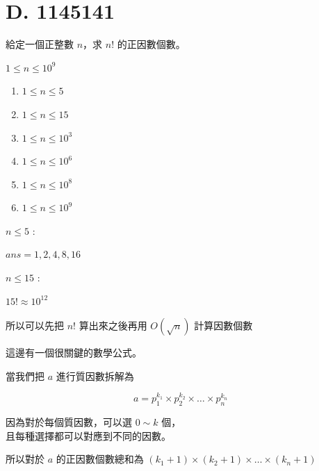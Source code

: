 \section{D. 1145141}

\begin{frame}{}
    給定一個正整數 $n$，求 $n!$ 的正因數個數。

    $1 \le n \le 10^9$
\end{frame}

\begin{frame}{}
    \begin{enumerate}
        \item{$1 \le n \le 5$}
        \item{$1 \le n \le 15$}
        \item{$1 \le n \le 10^3$}
        \item{$1 \le n \le 10^6$}
        \item{$1 \le n \le 10^8$}
        \item{$1 \le n \le 10^9$}
    \end{enumerate}
\end{frame}

\begin{frame}{}
    $n \le 5$ :

    $ans = {1, 2, 4, 8, 16}$
    \pause

    $n \le 15$ :

    $15! \approx 10^{12}$

    所以可以先把 $n!$ 算出來之後再用 $O(\sqrt{n})$ 計算因數個數
\end{frame}

\begin{frame}{}
    這邊有一個很關鍵的數學公式。

    \begin{corollary}
    當我們把 $a$ 進行質因數拆解為

    $$
    a = p_1^{k_1} \times p_2^{k_2} \times \ldots \times p_n^{k_n}
    $$

    因為對於每個質因數，可以選 $0 \sim k$ 個，\\且每種選擇都可以對應到不同的因數。

    所以對於 $a$ 的正因數個數總和為 $(k_1 + 1) \times (k_2 + 1) \times \ldots \times (k_n + 1)$
    \end{corollary}
\end{frame}


